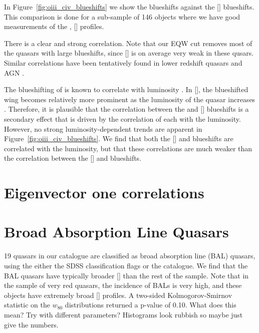 In Figure~\ref{fig:oiii_civ_blueshifts} we show the  blueshifts against the [] blueshifts.
This comparison is done for a sub-sample of 146 objects where we have good measurements of the , [] profiles. 

There is a clear and strong correlation. 
Note that our EQW cut removes most of the quasars with large  blueshifts, since [] is on average very weak in these qusars. 
Similar correlations have been tentatively found in lower redshift quasars and \ac{AGN} \citep{zamanov02}. 

The blueshifting of  is known to correlate with luminosity \citep{richards11}.
In [], the blueshifted wing becomes relatively more prominent as the luminosity of the quasar increases \citep{shen14}. 
Therefore, it is plausible that the correlation between the  and [] blueshifts is a secondary effect that is driven by the correlation of each with the luminosity. 
However, no strong luminosity-dependent trends are apparent in Figure~\ref{fig:oiii_civ_blueshifts}. 
We find that both the [] and  blueshifts are correlated with the luminosity, but that these correlations are much weaker than the correlation between the [] and  blueshifts. 



\section{Eigenvector one correlations}



\section{Broad Absorption Line Quasars}

19 quasars in our catalogue are classified as broad absorption line (BAL) quasars, using the either the SDSS classification flags or the \citet{allen11} catalogue. 
We find that the BAL quasars have typically broader [] than the rest of the sample. 
Note that in the \citet{zakamska16} sample of very red quasars, the incidence of BALs is very high, and these objects have extremely broad [] profiles. 
A two-sided Kolmogorov-Smirnov statistic on the $w_{80}$ distributions returned a p-value of 0.10. 
What does this mean?
Try with different parameters?
Histograms look rubbish so maybe just give the numbers. 

